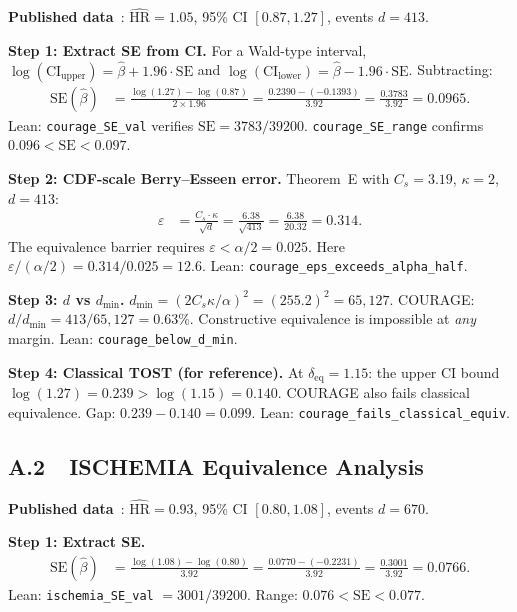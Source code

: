 \documentclass[11pt,a4paper]{article}
\theoremstyle{plain}
\theoremstyle{definition}
\begin{document}
\noindent\textbf{Published data}~\cite{boden-courage}: $\widehat{\mathrm{HR}} = 1.05$, 95\% CI $[0.87, 1.27]$, events $d = 413$.

\smallskip\noindent\textbf{Step 1: Extract SE from CI.}  For a Wald-type interval, $\log(\mathrm{CI}_{\mathrm{upper}}) = \hat\beta + 1.96 \cdot \mathrm{SE}$ and $\log(\mathrm{CI}_{\mathrm{lower}}) = \hat\beta - 1.96 \cdot \mathrm{SE}$.  Subtracting:
\begin{align*}
  \mathrm{SE}(\hat\beta) &= \frac{\log(1.27) - \log(0.87)}{2 \times 1.96} = \frac{0.2390 - (-0.1393)}{3.92} = \frac{0.3783}{3.92} = 0.0965.
\end{align*}
Lean: \texttt{courage\_SE\_val} verifies $\mathrm{SE} = 3783/39200$.  \texttt{courage\_SE\_range} confirms $0.096 < \mathrm{SE} < 0.097$.

\smallskip\noindent\textbf{Step 2: CDF-scale Berry--Esseen error.}  Theorem~E with $C_s = 3.19$, $\kappa = 2$, $d = 413$:
\begin{align*}
  \varepsilon &= \frac{C_s \cdot \kappa}{\sqrt{d}} = \frac{6.38}{\sqrt{413}} = \frac{6.38}{20.32} = 0.314.
\end{align*}
The equivalence barrier requires $\varepsilon < \alpha/2 = 0.025$.  Here $\varepsilon/(\alpha/2) = 0.314/0.025 = 12.6$.  Lean: \texttt{courage\_eps\_exceeds\_alpha\_half}.

\smallskip\noindent\textbf{Step 3: $d$ vs $d_{\min}$.}  $d_{\min} = (2C_s\kappa/\alpha)^2 = (255.2)^2 = 65{,}127$.  COURAGE: $d/d_{\min} = 413/65{,}127 = 0.63\%$.  Constructive equivalence is impossible at \emph{any} margin.  Lean: \texttt{courage\_below\_d\_min}.

\smallskip\noindent\textbf{Step 4: Classical TOST (for reference).}  At $\delta_{\mathrm{eq}} = 1.15$: the upper CI bound $\log(1.27) = 0.239 > \log(1.15) = 0.140$.  COURAGE also fails classical equivalence.  Gap: $0.239 - 0.140 = 0.099$.  Lean: \texttt{courage\_fails\_classical\_equiv}.

\subsection*{A.2\ \ ISCHEMIA Equivalence Analysis}

\noindent\textbf{Published data}~\cite{maron-ischemia}: $\widehat{\mathrm{HR}} = 0.93$, 95\% CI $[0.80, 1.08]$, events $d = 670$.

\smallskip\noindent\textbf{Step 1: Extract SE.}
\begin{align*}
  \mathrm{SE}(\hat\beta) &= \frac{\log(1.08) - \log(0.80)}{3.92} = \frac{0.0770 - (-0.2231)}{3.92} = \frac{0.3001}{3.92} = 0.0766.
\end{align*}
Lean: \texttt{ischemia\_SE\_val} $= 3001/39200$.  Range: $0.076 < \mathrm{SE} < 0.077$.
\end{document}
